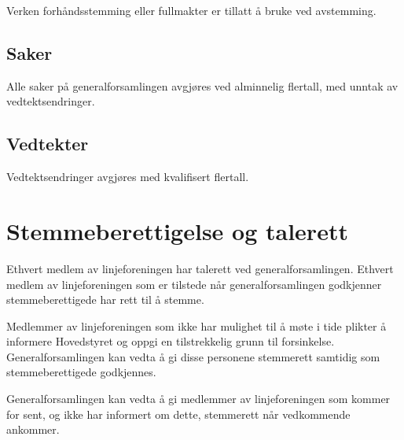 Verken forhåndsstemming eller fullmakter er tillatt å bruke ved avstemming.

\subsection{Saker}

Alle saker på generalforsamlingen avgjøres ved alminnelig flertall, med unntak av vedtektsendringer. 

\subsection{Vedtekter}
\vspace{23pt}

Vedtektsendringer avgjøres med kvalifisert flertall. 




\section{Stemmeberettigelse og talerett}
\vspace{23pt}
Ethvert medlem av linjeforeningen har talerett ved generalforsamlingen.
Ethvert medlem av linjeforeningen som er tilstede når generalforsamlingen godkjenner stemmeberettigede har rett til å stemme.\newline

Medlemmer av linjeforeningen som ikke har mulighet til å møte i tide plikter å informere Hovedstyret og oppgi en tilstrekkelig grunn til forsinkelse. Generalforsamlingen kan vedta å gi disse personene stemmerett samtidig som stemmeberettigede godkjennes.

Generalforsamlingen kan vedta å gi medlemmer av linjeforeningen som kommer for sent, og ikke har informert om dette, stemmerett når vedkommende ankommer.


